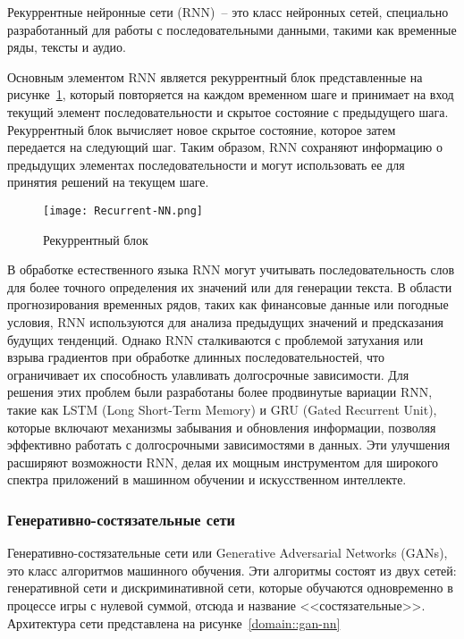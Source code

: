 Рекуррентные нейронные сети (RNN)~-- это класс нейронных сетей, специально разработанный для работы с последовательными данными, такими как временные ряды, тексты и аудио. 

Основным элементом RNN является рекуррентный блок представленные на рисунке~\ref{domain::recurrent-nn}, который повторяется на каждом временном шаге и принимает на вход текущий элемент последовательности и скрытое состояние с предыдущего шага. Рекуррентный блок вычисляет новое скрытое состояние, которое затем передается на следующий шаг. Таким образом, RNN сохраняют информацию о предыдущих элементах последовательности и могут использовать ее для принятия решений на текущем шаге.

\begin{figure}[ht]
    \centering
    \texttt{[image: Recurrent-NN.png]}
    \caption{Рекуррентный блок}
    \label{domain::recurrent-nn}
\end{figure}

В обработке естественного языка RNN могут учитывать последовательность слов для более точного определения их значений или для генерации текста. В области прогнозирования временных рядов, таких как финансовые данные или погодные условия, RNN используются для анализа предыдущих значений и предсказания будущих тенденций. Однако RNN сталкиваются с проблемой затухания или взрыва градиентов при обработке длинных последовательностей, что ограничивает их способность улавливать долгосрочные зависимости. Для решения этих проблем были разработаны более продвинутые вариации RNN, такие как LSTM (Long Short-Term Memory) и GRU (Gated Recurrent Unit), которые включают механизмы забывания и обновления информации, позволяя эффективно работать с долгосрочными зависимостями в данных. Эти улучшения расширяют возможности RNN, делая их мощным инструментом для широкого спектра приложений в машинном обучении и искусственном интеллекте.

\subsubsection{Генеративно-состязательные сети}

Генеративно-состязательные сети или Generative Adversarial Networks (GANs), это класс алгоритмов машинного обучения. Эти алгоритмы состоят из двух сетей: генеративной сети и дискриминативной сети, которые обучаются одновременно в процессе игры с нулевой суммой, отсюда и название <<состязательные>>. Архитектура сети представлена на рисунке~\ref{domain::gan-nn}

